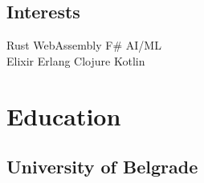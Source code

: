 \documentclass[letterpaper]{cv_12} %
\begin{document}
\begin{minipage}[t]{0.33\textwidth}
\sectionspace%

\subsection{Interests}

Rust \textbullet{} WebAssembly \textbullet{} F\# \textbullet{} AI/ML\\ 
Elixir \textbullet{} Erlang \textbullet{} Clojure \textbullet{} Kotlin

\sectionspace%


\section{Education} 

\subsection{University of Belgrade}


\sectionspace%


\sectionspace%


\end{minipage} %
\hfill
%
%
\end{document}
